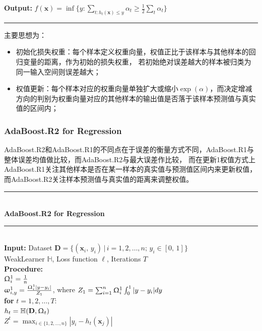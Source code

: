 \documentclass[a4paper]{article}
\begin{document}
			\textbf{Output:} $f(\textbf{x}) = \inf \{y:\sum_{t:h_t(\textbf{x})\leq y}\alpha_t \geq \frac{1}{2}\sum_t \alpha_t\}$\\
			\noindent\rule[0.1\baselineskip]{\textwidth}{0.75pt}
			主要思想为：
			\begin{itemize}
				\item 初始化损失权重：每个样本定义权重向量，权值正比于该样本与其他样本的回归变量的距离，作为初始的损失权重，
						若初始绝对误差越大的样本被归类为同一输入空间则误差越大；
				\item 权值更新：每个样本对应的权重向量单独扩大或缩小$\exp(\alpha)$，而决定增减方向的判别为权重向量对应的其他样本的输出值是否落于该样本预测值与真实值的区间内；
			\end{itemize}
		\subsubsection{AdaBoost.R2 for Regression}
			AdaBoost.R2和AdaBoost.R1的不同点在于误差的衡量方式不同，AdaBoost.R1与整体误差均值做比较，而AdaBoost.R2与最大误差作比较，
			而在更新1权值方式上AdaBoost.R1关注其他样本是否在某一样本的真实值与预测值区间内来更新权值，
			而AdaBoost.R2关注样本预测值与真实值的距离来调整权值。\\
			\noindent\rule[0.1\baselineskip]{\textwidth}{0.75pt}\\
			\textbf{AdaBoost.R2 for Regression}\\
			\noindent\rule[0.1\baselineskip]{\textwidth}{0.5pt}\\
			\textbf{Input:}	Dataset $\textbf{D} = \{(\textbf{x}_i,\,y_i)\,|\,i = 1, 2,\dots, n;\, y_i \in [0,\,1]\}$\\
			\hspace*{32pt}	WeakLearner $\mathbb{H}$, Loss function $\ell$, Iterations $T$\\
			\textbf{Procedure:}\\ 
			  	\hspace*{32pt} 	$\Upomega^1_i = \frac{1}{n}$\\
			  	\hspace*{33pt}	$\upomega_{i,y}^1 = \frac{\Upomega^1_i|y-y_i|}{Z_1}$, where $Z_1 = \sum_{i=1}^{n}\Upomega^1_i\int_{0}^{1}|y-y_i|dy$\\
			  	\hspace*{32pt}	\textbf{for} $t = 1, 2,\dots, T$:\\
			    \hspace*{48pt}	$h_t = \mathbb{H}(\textbf{D}, \Upomega_t)$\\
			    \hspace*{48pt}	$Z^t = \max_{i \in \{1,2,\dots,n\}}|y_i-h_t(\textbf{x}_j)|$\\
\end{document}
